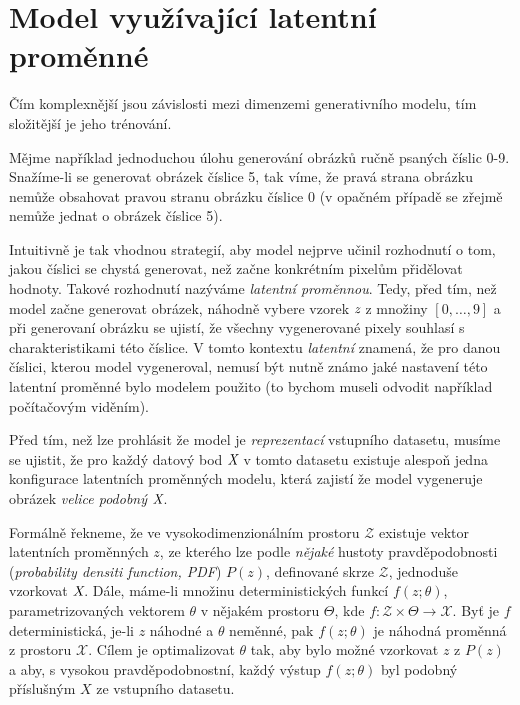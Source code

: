 \section{Model využívající latentní proměnné}

Čím komplexnější jsou závislosti mezi dimenzemi generativního modelu, tím složitější je jeho trénování.

Mějme například jednoduchou úlohu generování obrázků ručně psaných číslic 0-9.
Snažíme-li se generovat obrázek číslice 5, tak víme, že pravá strana obrázku nemůže obsahovat pravou stranu obrázku číslice 0 (v opačném případě se zřejmě nemůže jednat o obrázek číslice 5).

Intuitivně je tak vhodnou strategií, aby model nejprve učinil rozhodnutí o tom, jakou číslici se chystá generovat, než začne konkrétním pixelům přidělovat hodnoty.
Takové rozhodnutí nazýváme \emph{latentní proměnnou}. Tedy, před tím, než model začne generovat obrázek, náhodně vybere vzorek $\emph{z}$ z množiny $[0, \dots, 9]$ a při generovaní obrázku se ujistí, že všechny vygenerované pixely souhlasí s charakteristikami této číslice.
V tomto kontextu \emph{latentní} znamená, že pro danou číslici, kterou model vygeneroval, nemusí být nutně známo jaké nastavení této latentní proměnné bylo modelem použito (to bychom museli odvodit například počítačovým viděním). \cite{Doersch2021}

Před tím, než lze prohlásit že model je \emph{reprezentací} vstupního datasetu, musíme se ujistit, že pro každý datový bod $\emph{X}$ v tomto datasetu existuje alespoň jedna konfigurace latentních proměnných modelu, která zajistí že model vygeneruje obrázek \emph{velice podobný} $\emph{X}$.

Formálně řekneme, že ve vysokodimenzionálním prostoru $\mathcal{Z}$ existuje vektor latentních proměnných $z$, ze kterého lze podle \emph{nějaké} hustoty pravděpodobnosti (\emph{probability densiti function, PDF}) $P(z)$, definované skrze $\mathcal{Z}$, jednoduše vzorkovat $\emph{X}$.
Dále, máme-li množinu deterministických funkcí $f(z;\theta)$, parametrizovaných vektorem $\theta$ v nějakém prostoru $\Theta$, kde $f: \mathcal{Z} \times \Theta \rightarrow \mathcal{X}$. Byť je $f$ deterministická, je-li $z$ náhodné a $\theta$ neměnné, pak $f(z;\theta)$ je náhodná proměnná z prostoru $\mathcal{X}$. Cílem je optimalizovat $\theta$ tak, aby bylo možné vzorkovat $z$ z $P(z)$ a aby, s vysokou pravděpodobnostní, každý výstup $f(z; \theta)$ byl podobný příslušným $X$ ze vstupního datasetu. \cite{Doersch2021}

